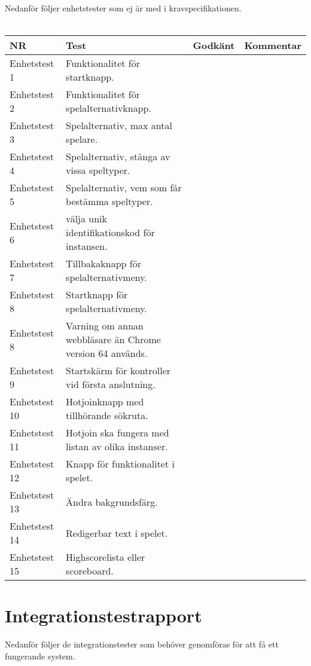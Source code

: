 \documentclass[10pt]{article}
\begin{document}
  \noindent Nedanför följer enhetstester som ej är med i kravspecifikationen.
\\ \\
\noindent
	\begin{tabular}{| p{2.1cm}|  p{5cm} | p{1.2cm}| p{7cm}|}
	
      \hline
      NR&Test&Godkänt&Kommentar\\
      \hline
    
		Enhetstest 1&Funktionalitet för startknapp.&&\\
		\hline
		Enhetstest 2&Funktionalitet för spelalternativknapp.&&\\
		\hline
		Enhetstest 3&Spelalternativ, max antal spelare.&&\\
		\hline
		Enhetstest 4&Spelalternativ, stänga av vissa speltyper.&&\\
		\hline
		Enhetstest 5&Spelalternativ, vem som får bestämma speltyper.&&\\
		\hline
		Enhetstest 6&välja unik identifikationskod för instansen.&&\\
		\hline
		Enhetstest 7&Tillbakaknapp för spelalternativmeny.&&\\
		\hline
		Enhetstest 8&Startknapp för spelalternativmeny.&&\\
		\hline
		Enhetstest 8&Varning om annan webbläsare än Chrome version 64 används.&&\\
		\hline
		Enhetstest 9&Startskärm för kontroller vid första anslutning.&&\\
		\hline
		Enhetstest 10&Hotjoinknapp med tillhörande sökruta.&&\\
		\hline
		Enhetstest 11&Hotjoin ska fungera med listan av olika instanser.&&\\
		\hline
		Enhetstest 12&Knapp för funktionalitet i spelet.&&\\
		\hline
		Enhetstest 13&Ändra bakgrundsfärg.&&\\
		\hline
		Enhetstest 14&Redigerbar text i spelet.&&\\
		\hline
		Enhetstest 15&Highscorelista eller scoreboard.&&\\
		\hline



   
  \end{tabular}
  

\section{Integrationstestrapport}
Nedanför följer de integrationstester som behöver genomföras för att få ett fungerande system. \\
\\
\end{document}
